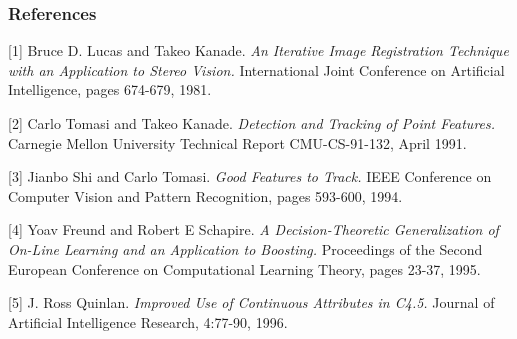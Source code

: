 \documentclass{article} %
\begin{document}
\subsubsection*{References}


\small{
[1] Bruce D. Lucas and Takeo Kanade. {\it An Iterative Image Registration Technique with an Application to Stereo Vision.} International Joint Conference on Artificial Intelligence, pages 674-679, 1981.

[2] Carlo Tomasi and Takeo Kanade. {\it Detection and Tracking of Point Features.} Carnegie Mellon University Technical Report CMU-CS-91-132, April 1991.

[3] Jianbo Shi and Carlo Tomasi. {\it Good Features to Track.} IEEE Conference on Computer Vision and Pattern Recognition, pages 593-600, 1994.

[4] Yoav Freund and Robert E Schapire. {\it A Decision-Theoretic Generalization of On-Line Learning and an Application to Boosting.} Proceedings of the Second European Conference on Computational Learning Theory, pages 23-37, 1995.

[5] J. Ross Quinlan. {\it Improved Use of Continuous Attributes in C4.5.} Journal of Artificial Intelligence Research, 4:77-90, 1996.
}
\end{document}
